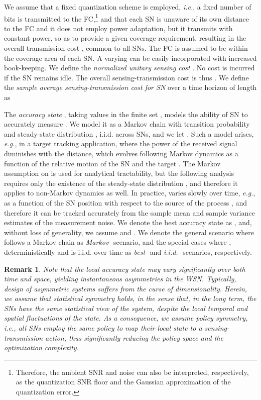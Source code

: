 \documentclass[10pt,twocolumn,twoside]{IEEEtran}
\theoremstyle{plain}
\newtheorem{remark}{Remark}
\begin{document}
   
We assume that
   a fixed quantization scheme is employed, \emph{i.e.}, a fixed number of bits is transmitted to the FC,\footnote{Therefore, 
   the ambient SNR  and noise  can also be interpreted, respectively, as the quantization SNR floor and the Gaussian approximation of the quantization error.}
and that each SN is unaware of its own distance to the FC
and it does not employ power adaptation, but it
 transmits with constant power, so as to provide a given coverage requirement,
resulting in the overall transmission cost , common to all SNs.
 The FC is assumed to be within the coverage area 
of each SN. A varying  can be easily incorporated with increased book-keeping.
We define the \emph{normalized unitary sensing cost} .
No cost is incurred if the SN remains idle.
The overall sensing-transmission cost
is thus .
We define the \emph{sample average sensing-transmission cost for SN } over a time horizon of length  as


The \emph{accuracy state} , taking values in the finite set , models the ability of SN  to accurately measure .
We model it as a Markov chain with transition probability  
and steady-state distribution ,
i.i.d. across SNs, and we let .
{Such a model arises, \emph{e.g.}, in a target tracking application, where the power of the received signal diminishes with the distance, which 
evolves following Markov dynamics as a function of the relative motion of the SN and the target  \cite{Xiao}.
The Markov assumption on  is used for analytical tractability, but the following analysis requires only the existence of
the steady-state distribution , and therefore it applies to non-Markov dynamics as well.}
In practice,  varies slowly over time, \emph{e.g.}, as a function of the SN position with respect to the
source of the process , and therefore it can be tracked accurately
 from the sample mean and sample variance estimates of the measurement noise. 
  We denote the best accuracy state as ,
and, without loss of generality, we assume  and .
 We denote the general scenario where  follows a Markov chain as \emph{Markov-} scenario,
and the special cases where ,  deterministically 
and  is i.i.d. over time as \emph{best-} and \emph{i.i.d.-} scenarios, respectively.
\vspace{-3mm}
\begin{remark}
\label{rem22}
 Note that the local accuracy state may vary significantly over both time and space, yielding instantaneous \emph{asymmetries} in the WSN. Typically, design of 
 asymmetric systems suffers from the curse of dimensionality. Herein, we assume that \emph{statistical symmetry} holds, in the sense that, in the long term, the SNs have the same statistical view of the system, despite the local temporal and spatial fluctuations of the state. 
 As a consequence, we assume \emph{policy symmetry}, \emph{i.e.}, all SNs employ the same policy to map
 their local state to a sensing-transmission action, thus significantly reducing the policy space and the optimization complexity.
 \end{remark}
\end{document}
